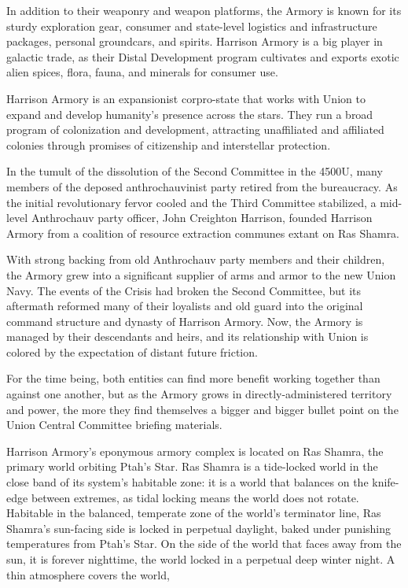 In addition to their weaponry and weapon platforms, the Armory is known for its sturdy exploration  
gear, consumer and state-level logistics and infrastructure packages, personal groundcars, and  
spirits. Harrison Armory is a big player in galactic trade, as their Distal Development program  
cultivates and exports exotic alien spices, flora, fauna, and minerals for consumer use.    

Harrison Armory is an expansionist corpro-state that works with Union to expand and develop  
humanity’s presence across the stars. They run a broad program of colonization and  
development, attracting unaffiliated and affiliated colonies through promises of citizenship and  
interstellar protection. 
 

In the tumult of the dissolution of the Second Committee in the 4500U, many members of the  
deposed anthrochauvinist party retired from the bureaucracy. As the initial revolutionary fervor  
cooled and the Third Committee stabilized, a mid-level Anthrochauv party officer, John Creighton  
Harrison, founded Harrison Armory from a coalition of resource extraction communes extant on  
Ras Shamra. 
 

With strong backing from old Anthrochauv party members and their children, the Armory grew  
into a significant supplier of arms and armor to the new Union Navy. The events of the Crisis had  
broken the Second Committee, but its aftermath reformed many of their loyalists and old guard  
into the original command structure and dynasty of Harrison Armory. Now, the Armory is  
managed by their descendants and heirs, and its relationship with Union is colored by the  
expectation of distant future friction. 
 

For the time being, both entities can find more benefit working together than against one another,  
but as the Armory grows in directly-administered territory and power, the more they find  
themselves a bigger and bigger bullet point on the Union Central Committee briefing materials. 
 

Harrison Armory’s eponymous armory complex is located on Ras Shamra, the primary world  
orbiting Ptah’s Star. Ras Shamra is a tide-locked world in the close band of its system’s habitable  
zone: it is a world that balances on the knife-edge between extremes, as tidal locking means the  
world does not rotate. Habitable in the balanced, temperate zone of the world’s terminator line,  
Ras Shamra’s sun-facing side is locked in perpetual daylight, baked under punishing  
temperatures from Ptah’s Star. On the side of the world that faces away from the sun, it is forever  
nighttime, the world locked in a perpetual deep winter night. A thin atmosphere covers the world,  

